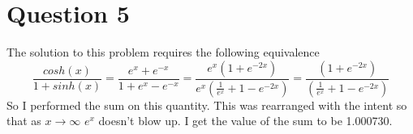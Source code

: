 \documentclass[a4paper,12pt]{article}
\begin{document}
  \section{Question 5}
  The solution to this problem requires the following equivalence
  \begin{equation}
  \frac{cosh(x)}{1+sinh(x)} = \frac{e^x + e^{-x}}{1+e^x - e^{-x}} =\frac{e^x (1+e^{-2x})}{e^x(\frac{1}{e^x}+1-e^{-2x})} = \frac{ (1+e^{-2x})}{(\frac{1}{e^x}+1-e^{-2x})}
  \end{equation}
So I performed the sum on this quantity. This was rearranged with the intent so that as $x\rightarrow \infty$ $e^x$ doesn't blow up. I get the value of the sum to be 1.000730.
\end{document}
